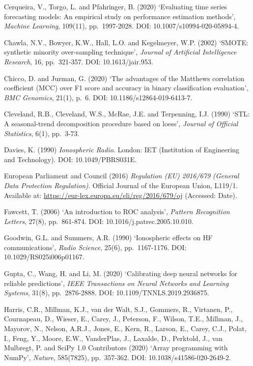 Cerqueira, V., Torgo, L. and Pfahringer, B. (2020) `Evaluating time
series forecasting models: An empirical study on performance estimation
methods', \emph{Machine Learning}, 109(11), pp.~1997-2028. DOI:
10.1007/s10994-020-05894-4.

Chawla, N.V., Bowyer, K.W., Hall, L.O. and Kegelmeyer, W.P. (2002)
`SMOTE: synthetic minority over-sampling technique', \emph{Journal of
Artificial Intelligence Research}, 16, pp.~321-357. DOI:
10.1613/jair.953.

Chicco, D. and Jurman, G. (2020) `The advantages of the Matthews
correlation coefficient (MCC) over F1 score and accuracy in binary
classification evaluation', \emph{BMC Genomics}, 21(1), p.~6. DOI:
10.1186/s12864-019-6413-7.

Cleveland, R.B., Cleveland, W.S., McRae, J.E. and Terpenning, I.J.
(1990) `STL: A seasonal-trend decomposition procedure based on loess',
\emph{Journal of Official Statistics}, 6(1), pp.~3-73.

Davies, K. (1990) \emph{Ionospheric Radio}. London: IET (Institution of
Engineering and Technology). DOI: 10.1049/PBRS031E.

European Parliament and Council (2016) \emph{Regulation (EU) 2016/679
(General Data Protection Regulation)}. Official Journal of the European
Union, L119/1. Available at:
\url{https://eur-lex.europa.eu/eli/reg/2016/679/oj} (Accessed: Date).

Fawcett, T. (2006) `An introduction to ROC analysis', \emph{Pattern
Recognition Letters}, 27(8), pp.~861-874. DOI:
10.1016/j.patrec.2005.10.010.

Goodwin, G.L. and Summers, A.R. (1990) `Ionospheric effects on HF
communications', \emph{Radio Science}, 25(6), pp.~1167-1176. DOI:
10.1029/RS025i006p01167.

Gupta, C., Wang, H. and Li, M. (2020) `Calibrating deep neural networks
for reliable predictions', \emph{IEEE Transactions on Neural Networks
and Learning Systems}, 31(8), pp.~2876-2888. DOI:
10.1109/TNNLS.2019.2936875.

Harris, C.R., Millman, K.J., van der Walt, S.J., Gommers, R., Virtanen,
P., Cournapeau, D., Wieser, E., Carey, J., Peterson, F., Wilson, T.E.,
Millman, J., Mayorov, N., Nelson, A.R.J., Jones, E., Kern, R., Larson,
E., Carey, C.J., Polat, I., Feng, Y., Moore, E.W., VanderPlas, J.,
Laxalde, D., Perktold, J., van Mulbregt, P. and SciPy 1.0 Contributors
(2020) `Array programming with NumPy', \emph{Nature}, 585(7825),
pp.~357-362. DOI: 10.1038/s41586-020-2649-2.

